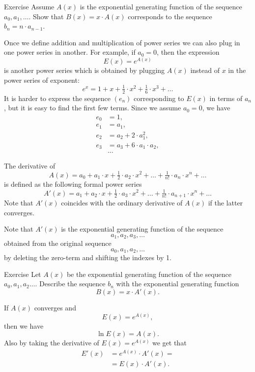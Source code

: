 \begin{thm}{Exercise}
Assume $A(x)$ is the exponential generating function of the sequence $a_0,a_1,\dots$.
Show that $B(x)=x\cdot A(x)$ corresponds to the sequence $b_n=n\cdot a_{n-1}$.
\end{thm}


Once we define addition and multiplication of power series we can also plug in one power series in another.
For example, if $a_0=0$, then the expression 
\[E(x)=e^{A(x)}\] is another power series which is obtained by plugging $A(x)$ instead of $x$ in the power series of exponent:
\[e^x=1+x+\tfrac12\cdot x^2+\tfrac16\cdot x^3+\dots\]
It is harder to express the sequence $(e_n)$ corresponding to $E(x)$ in terms of $a_n$, but it is easy to find the first few terms.
Since we assume $a_0=0$, we have
\begin{align*}
e_0&=1,
\\
e_1&=a_1,
\\
e_2&=a_2+2\cdot a_1^2,
\\
e_3&=a_3+6\cdot a_1\cdot a_2,
\\
&\dots
\end{align*}

The derivative of 
\[A(x)=a_0+a_1\cdot x+\tfrac12\cdot a_2\cdot x^2+\dots+\tfrac1{n!}\cdot a_n\cdot x^n+\dots\]
is defined as the following formal power series 
\[A'(x)=a_1+a_2\cdot x+\tfrac12\cdot a_3\cdot x^2+\dots+\tfrac1{n!}\cdot a_{n+1}\cdot x^n+\dots\]
Note that $A'(x)$ coincides with the ordinary derivative of $A(x)$ if the latter converges.

Note that $A'(x)$ is the exponential generating function of the sequence 
\[a_1,a_2,a_3,\dots\]
obtained from the original sequence 
\[a_0,a_1,a_2,\dots\]
by deleting the zero-term and shifting the indexes by 1.


\begin{thm}{Exercise}
Let $A(x)$ be the exponential generating function of the sequence $a_0,a_1,a_2\dots$.
Describe the sequence $b_n$ with the exponential generating function
\[B(x)=x\cdot A'(x).\]
\end{thm}

If $A(x)$ converges and
\[E(x)=e^{A(x)},\] 
then we have 
\[\ln E(x)=A(x).\]
Also by taking the derivative of $E(x)=e^{A(x)}$ we get that
\begin{align*}
E'(x)
&=e^{A(x)}\cdot A'(x)=
\\
&= E(x)\cdot A'(x).
\end{align*}


